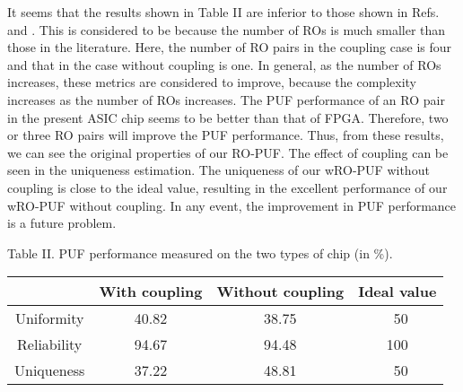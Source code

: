 \documentclass[%
reprint, amsmath,amssymb,%
pra,
]{revtex4-1}
\begin{document}
It seems that the results shown in Table II are inferior to those shown in Refs.~\cite{Maiti3} and \cite{Hori}.
This is considered to be because the number of ROs is much smaller 
than those in the literature. 
Here, the number of RO pairs in the coupling case is four and that in the case without coupling is one.
In general, as the number of ROs increases, these metrics are considered to improve,
because the complexity increases as the number of ROs increases.
The PUF performance of an RO pair in the present ASIC chip seems to be better than 
that of FPGA. Therefore, two or three RO pairs will improve the PUF performance. %
Thus, from these results, we can see the original properties of our RO-PUF.
The effect of coupling can be seen in the uniqueness estimation. 
The uniqueness of our wRO-PUF without coupling is close to the ideal value, resulting in the 
excellent performance of our wRO-PUF without coupling.
In any event, the improvement in PUF performance is a future problem.


\begin{table}
\begin{center}
Table II. 
{PUF performance measured on the two types of chip (in \%)}. 
\begin{tabular}{|c|c|c|c|}\hline
&  With coupling %
&  Without coupling %
&  Ideal value
\\ \hline
Uniformity 
& 40.82 %
& 38.75 %
&\ 50 
\\
Reliability
& 94.67  %
& 94.48 %
& 100 
\\
Uniqueness
& 37.22  %
& 48.81  %
& \ 50 
\\ \hline
\end{tabular}
\end{center}
\end{table}
\end{document}

